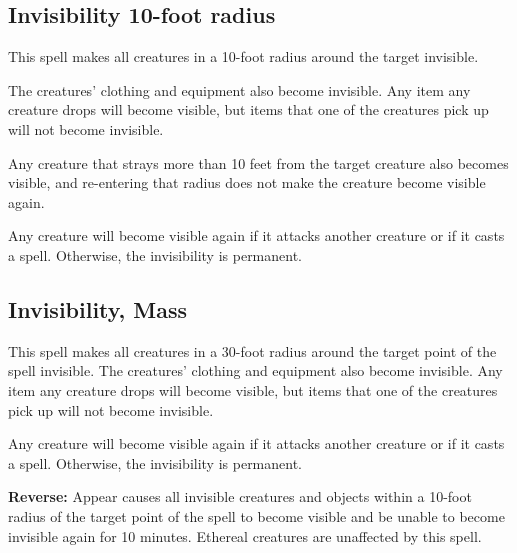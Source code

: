 \begin{multicols*}{2}
\subsection{Invisibility 10-foot radius}\label{spell:Invisibility 10-foot radius}

This spell makes all creatures in a 10-foot radius around the target invisible.

The creatures’ clothing and equipment also become invisible. Any item any creature drops will become visible, but items that one of the creatures pick up will not become invisible.

Any creature that strays more than 10 feet from the target creature also becomes visible, and re-entering that radius does not make the creature become visible again.

Any creature will become visible again if it attacks another creature or if it casts a spell. Otherwise, the invisibility is permanent.

\subsection{Invisibility, Mass}\label{spell:Invisibility, Mass}

This spell makes all creatures in a 30-foot radius around the target point of the spell invisible. The creatures’ clothing and equipment also become invisible. Any item any creature drops will become visible, but items that one of the creatures pick up will not become invisible.

Any creature will become visible again if it attacks another creature or if it casts a spell. Otherwise, the invisibility is permanent.

\textbf{Reverse:} \hypertarget{spell:Appear}{Appear} causes all invisible creatures and objects within a 10-foot radius of the target point of the spell to become visible and be unable to become invisible again for 10 minutes. Ethereal creatures are unaffected by this spell.


\end{multicols*}
